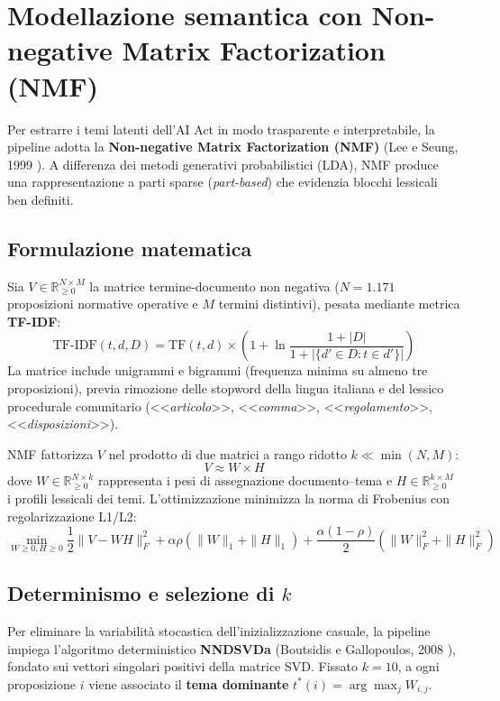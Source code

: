 \documentclass[12pt,a4paper,oneside]{report}
\begin{document}
\section{Modellazione semantica con Non-negative Matrix Factorization (NMF)}
\label{sec:nmf_metodologia}

Per estrarre i temi latenti dell'AI Act in modo trasparente e interpretabile, la pipeline adotta la \textbf{Non-negative Matrix Factorization (NMF)} (Lee e Seung, 1999 \cite{lee1999nmf}). A differenza dei metodi generativi probabilistici (LDA), NMF produce una rappresentazione a parti sparse (\emph{part-based}) che evidenzia blocchi lessicali ben definiti.

\subsection{Formulazione matematica}
Sia $V \in \mathbb{R}_{\ge 0}^{N \times M}$ la matrice termine-documento non negativa ($N = 1.171$ proposizioni normative operative e $M$ termini distintivi), pesata mediante metrica \textbf{TF-IDF}:
\begin{equation}
    \text{TF-IDF}(t, d, D) = \text{TF}(t, d) \times \left(1 + \ln\frac{1 + |D|}{1 + |\{d' \in D : t \in d'\}|}\right)
\end{equation}
La matrice include unigrammi e bigrammi (frequenza minima su almeno tre proposizioni), previa rimozione delle stopword della lingua italiana e del lessico procedurale comunitario (<<\emph{articolo}>>, <<\emph{comma}>>, <<\emph{regolamento}>>, <<\emph{disposizioni}>>).

NMF fattorizza $V$ nel prodotto di due matrici a rango ridotto $k \ll \min(N, M)$:
\begin{equation}
    V \approx W \times H
\end{equation}
dove $W \in \mathbb{R}_{\ge 0}^{N \times k}$ rappresenta i pesi di assegnazione documento--tema e $H \in \mathbb{R}_{\ge 0}^{k \times M}$ i profili lessicali dei temi. L'ottimizzazione minimizza la norma di Frobenius con regolarizzazione L1/L2:
\begin{equation}
    \min_{W \ge 0, H \ge 0} \frac{1}{2} \|V - W H\|_F^2 + \alpha \rho (\|W\|_1 + \|H\|_1) + \frac{\alpha(1-\rho)}{2} (\|W\|_F^2 + \|H\|_F^2)
\end{equation}

\subsection{Determinismo e selezione di \texorpdfstring{$k$}{k}}
Per eliminare la variabilità stocastica dell'inizializzazione casuale, la pipeline impiega l'algoritmo deterministico \textbf{NNDSVDa} (Boutsidis e Gallopoulos, 2008 \cite{boutsidis2008nndsvd}), fondato sui vettori singolari positivi della matrice SVD. Fissato \textbf{$k = 10$}, a ogni proposizione $i$ viene associato il \textbf{tema dominante} $t^*(i) = \arg\max_j W_{i, j}$.
\end{document}
